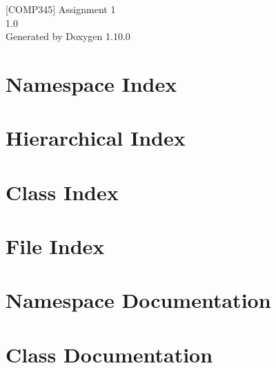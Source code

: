 \documentclass[twoside]{book}
\newcommand{\+}{\discretionary{\mbox{\scriptsize$\hookleftarrow$}}{}{}}
\newcommand{\clearemptydoublepage}{%
    \newpage{\pagestyle{empty}\cleardoublepage}%
  }
\begin{document}
  \raggedbottom
    \hypersetup{pageanchor=false,
                bookmarksnumbered=true,
                pdfencoding=unicode
               }
  \begin{titlepage}
  \vspace*{7cm}
  \begin{center}%
  {\Large \mbox{[}\+COMP345\mbox{]} Assignment 1}\\
  [1ex]\large 1.\+0 \\
  \vspace*{1cm}
  {\large Generated by Doxygen 1.10.0}\\
  \end{center}
  \end{titlepage}
  \clearemptydoublepage
  \tableofcontents
  \clearemptydoublepage
  \hypersetup{pageanchor=true}
\chapter{Namespace Index}

\chapter{Hierarchical Index}

\chapter{Class Index}

\chapter{File Index}

\chapter{Namespace Documentation}









\chapter{Class Documentation}




















\end{document}
